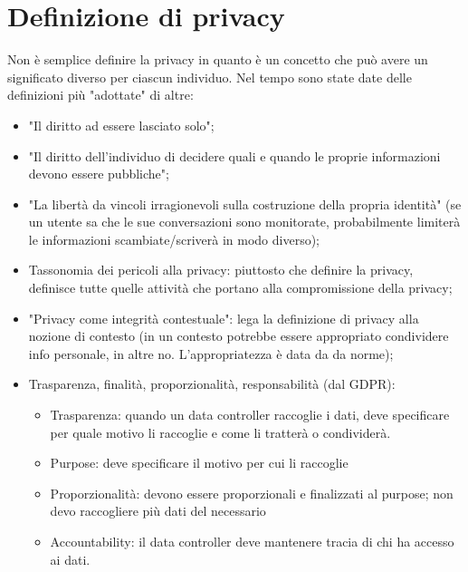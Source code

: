 \section{Definizione di privacy}
Non è semplice definire la privacy in quanto è un concetto che può avere un significato diverso per ciascun individuo. Nel tempo sono state date delle definizioni più "adottate" di altre:
\begin{itemize}
    \item "Il diritto ad essere lasciato solo";
    \item "Il diritto dell'individuo di decidere quali e quando le proprie informazioni devono essere pubbliche";
    \item "La libertà da vincoli irragionevoli sulla costruzione della propria identità" (se un utente sa che le sue conversazioni sono monitorate, probabilmente limiterà le informazioni scambiate/scriverà in modo diverso);
    \item Tassonomia dei pericoli alla privacy: piuttosto che definire la privacy, definisce tutte quelle attività che portano alla compromissione della privacy;
    \item "Privacy come integrità contestuale": lega la definizione di privacy alla nozione di contesto (in un contesto potrebbe essere appropriato condividere info personale, in altre no.  L’appropriatezza è data da da norme);
    \item Trasparenza, finalità, proporzionalità, responsabilità (dal GDPR):
    \begin{itemize}
        \item Trasparenza: quando un data controller raccoglie i dati, deve specificare per quale motivo li raccoglie e come li tratterà o condividerà.
        \item Purpose: deve specificare il motivo per cui li raccoglie
        \item Proporzionalità: devono essere proporzionali e finalizzati al purpose; non devo raccogliere più dati del necessario
        \item Accountability: il data controller deve mantenere tracia di chi ha accesso ai dati.
    \end{itemize}
\end{itemize}

